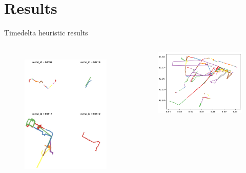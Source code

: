 \documentclass{beamer}
\begin{document}
\section{Results}
\begin{frame}{Timedelta heuristic results}
\begin{columns}[t, onlytextwidth]
	\begin{figure}[bt]
		\centering
		\includegraphics[width=\textwidth]{timedelta-result}
		\label{fig:timedelta-result}
	\end{figure}
	\begin{figure}[bt]
		\centering
		\includegraphics[width=\textwidth]{timedelta-lineplot}

\end{figure}
\end{columns}
\end{frame}
\end{document}
